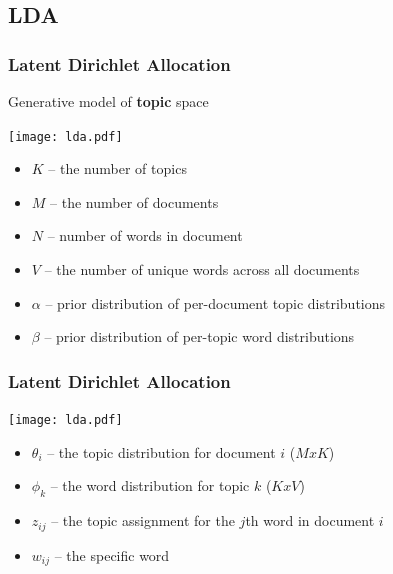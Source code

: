 \documentclass[t]{beamer}
\begin{document}
\subsection{LDA}
\begin{frame}
\frametitle{Latent Dirichlet Allocation}
Generative model of \textbf{topic} space

%
\texttt{[image: lda.pdf]}

\begin{itemize}
\item $K$ -- the number of topics
\item $M$ -- the number of documents
\item $N$ -- number of words in document
\item $V$ -- the number of unique words across all documents
\item $\alpha$ -- prior distribution of per-document topic distributions
\item $\beta$ -- prior distribution of per-topic word distributions
\end{itemize}

\cite{Blei2003}
\end{frame}

\begin{frame}
\frametitle{Latent Dirichlet Allocation}

%
\texttt{[image: lda.pdf]}

\begin{itemize}
\item $\theta_i$ -- the topic distribution for document $i$ ($MxK$)
\item $\phi_k$ -- the word distribution for topic $k$ ($KxV$)
\item $z_{ij}$ -- the topic assignment for the $j$th word in document $i$
\item $w_{ij}$ -- the specific word
\end{itemize}

\cite{Blei2003}
\end{frame}
\end{document}
